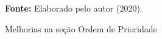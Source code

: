 \begin{figure}[ht!]
\centering

\caption{\textmd{Melhorias na seção Ordem de Prioridade}}
\label{fig:melhoriaordem}

\par\medskip\textbf{Fonte:} Elaborado pelo autor (2020). \par\medskip

\end{figure}

